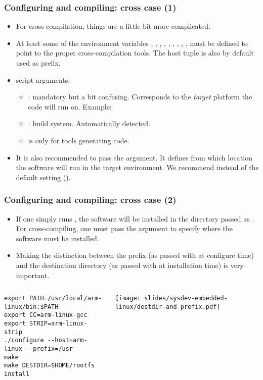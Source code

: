 \begin{frame}
  \frametitle{Configuring and compiling: cross case (1)}
  \begin{itemize}
  \item For cross-compilation, things are a little bit more complicated.
  \item At least some of the environment variables ,
    , , , , ,
    , , ,  must be
    defined to point to the proper cross-compilation tools. The host
    tuple is also by default used as prefix.
  \item {} script arguments:
    \begin{itemize}
    \item {}: mandatory but a bit confusing.
     Corresponds to the {\em target} platform the code will run on.
     Example: 
    \item {}: build system. Automatically detected.
    \item {} is only for tools generating code.
    \end{itemize}
  \item It is also recommended to pass the  argument. It
    defines from which location the software will run in the target
    environment. We recommend  instead of the default
    setting ().
  \end{itemize}
\end{frame}

\begin{frame}[fragile]
  \frametitle{Configuring and compiling: cross case (2)}
  \begin{itemize}
  \item If one simply runs , the software will be
    installed in the directory passed as . For
    cross-compiling, one must pass the  argument to
    specify where the software must be installed.
  \item Making the distinction between the prefix (as passed with
     at configure time) and the destination directory (as
    passed with  at installation time) is very important.
  \end{itemize}
  \begin{columns}
\footnotesize
\begin{block}{}
\begin{verbatim}
export PATH=/usr/local/arm-linux/bin:$PATH
export CC=arm-linux-gcc
export STRIP=arm-linux-strip
./configure --host=arm-linux --prefix=/usr
make
make DESTDIR=$HOME/rootfs install
\end{verbatim}
\end{block}
    \texttt{[image: slides/sysdev-embedded-linux/destdir-and-prefix.pdf]}
  \end{columns}
\end{frame}

